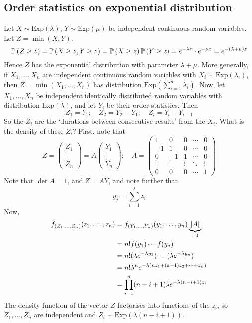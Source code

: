 \subsection{Order statistics on exponential distribution}
Let \(X \sim \mathrm{Exp}(\lambda)\), \(Y \sim \mathrm{Exp}(\mu)\) be independent continuous random variables.
Let \(Z = \min(X, Y)\).
\[
	\mathbb{P}\left({Z \geq z}\right) = \mathbb{P}\left({X \geq z, Y \geq z}\right) = \mathbb{P}\left({X \geq z}\right) \mathbb{P}\left({Y \geq z}\right) = e^{-\lambda z} \cdot e^{-\mu z} = e^{-(\lambda + \mu)z}
\]
Hence \(Z\) has the exponential distribution with parameter \(\lambda+\mu\).
More generally, if \(X_1, \dots, X_n\) are independent continuous random variables with \(X_i \sim \mathrm{Exp}(\lambda_i)\), then \(Z = \min(X_1, \dots, X_n)\) has distribution \(\mathrm{Exp}\left( \sum_{i=1}^n \lambda_i \right)\).
Now, let \(X_1, \dots, X_n\) be independent identically distributed random variables with distribution \(\mathrm{Exp}(\lambda)\), and let \(Y_i\) be their order statistics.
Then
\[
	Z_1 = Y_1;\quad Z_2 = Y_2 - Y_1;\quad Z_i = Y_i - Y_{i-1}
\]
So the \(Z_i\) are the `durations between consecutive results' from the \(X_i\).
What is the density of these \(Z_i\)?
First, note that
\[
	Z = \begin{pmatrix}
		Z_1 \\ \vdots \\ Z_n
	\end{pmatrix} = A \begin{pmatrix}
		Y_1 \\ \vdots \\ Y_n
	\end{pmatrix};\quad A = \begin{pmatrix}
		1      & 0      & 0      & \cdots & 0      \\
		-1     & 1      & 0      & \cdots & 0      \\
		0      & -1     & 1      & \cdots & 0      \\
		\vdots & \vdots & \vdots & \ddots & \vdots \\
		0      & 0      & 0      & \cdots & 1
	\end{pmatrix}
\]
Note that \(\det A = 1\), and \(Z = AY\), and note further that
\[
	y_j = \sum_{i=1}^j z_i
\]
Now,
\begin{align*}
	f_{(Z_1, \dots, Z_n)}(z_1, \dots, z_n) & = f_{(Y_1, \dots, Y_n)}(y_1, \dots, y_n) \underbrace{\abs{A}}_{=1} \\
	                                       & = n!
	f(y_1) \cdots f(y_n)                                                                                        \\
	                                       & = n!
	(\lambda e^{-\lambda y_1}) \cdots (\lambda e^{-\lambda y_n})                                                \\
	                                       & = n!
	\lambda^n e^{-\lambda(nz_1 + (n-1)z_2 + \dots + z_n)}                                                       \\
	                                       & = \prod_{i=1}^n (n-i+1) \lambda e^{-\lambda (n-i+1)z_i}
\end{align*}
The density function of the vector \(Z\) factorises into functions of the \(z_i\), so \(Z_1, \dots, Z_n\) are independent and \(Z_i \sim \mathrm{Exp}(\lambda(n-i+1))\).
